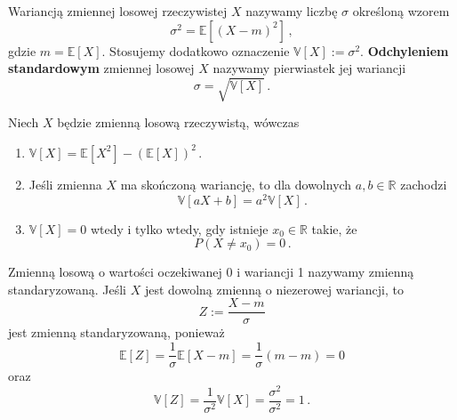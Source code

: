 \documentclass{myclass}
\numberwithin{equation}{subsection}
\begin{document}
\begin{definition}
Wariancją zmiennej losowej rzeczywistej \(X\) nazywamy liczbę \(\sigma\) określoną wzorem
\begin{equation*}
    \sigma^2 = \mathbb{E}[(X - m)^2]\,,
\end{equation*} 
gdzie \(m = \mathbb{E}[X]\). Stosujemy dodatkowo oznaczenie \(\mathbb{V}[X] := \sigma^2\).
\textbf{Odchyleniem standardowym} zmiennej losowej \(X\) nazywamy pierwiastek jej wariancji
\begin{equation*}
    \sigma = \sqrt{\mathbb{V}[X]}\,.
\end{equation*} 
\end{definition}

\begin{theorem}
Niech \(X\) będzie zmienną losową rzeczywistą, wówczas
\begin{enumerate}
    
    \item \(\mathbb{V}[X] = \mathbb{E}[X^2] - (\mathbb{E}[X])^2\)\,.

    \item Jeśli zmienna \(X\) ma skończoną wariancję, to dla dowolnych \(a,b \in \mathbb{R}\)
    zachodzi
    \begin{equation*}
        \mathbb{V}[aX + b] = a^2 \mathbb{V}[X]\,.
    \end{equation*}

    \item \(\mathbb{V}[X] = 0\) wtedy i tylko wtedy, gdy istnieje \(x_0 \in \mathbb{R}\) takie, że
    \begin{equation*}
        P(X \neq x_0) = 0\,.
    \end{equation*}

\end{enumerate}
\end{theorem}

\begin{definition}
Zmienną losową o wartości oczekiwanej 0 i wariancji 1 nazywamy zmienną standaryzowaną. Jeśli \(X\)
jest dowolną zmienną o niezerowej wariancji, to
\begin{equation*}
    Z := \frac{X - m}{\sigma}
\end{equation*}
jest zmienną standaryzowaną, ponieważ
\begin{equation*}
    \mathbb{E}[Z] = \frac{1}{\sigma}\mathbb{E}[X - m] = \frac{1}{\sigma}(m - m) = 0
\end{equation*}
oraz
\begin{equation*}
    \mathbb{V}[Z] = \frac{1}{\sigma^2} \mathbb{V}[X] = \frac{\sigma^2}{\sigma^2} = 1\,.
\end{equation*}
\end{definition}
\end{document}
